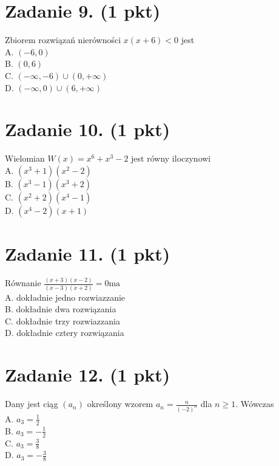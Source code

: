 \documentclass[10pt]{article}
\begin{document}
\section*{Zadanie 9. (1 pkt)}
Zbiorem rozwiązań nierówności \(x(x+6)<0\) jest\\
A. \((-6,0)\)\\
B. \((0,6)\)\\
C. \((-\infty,-6) \cup(0,+\infty)\)\\
D. \((-\infty, 0) \cup(6,+\infty)\)

\section*{Zadanie 10. (1 pkt)}
Wielomian \(W(x)=x^{6}+x^{3}-2\) jest równy iloczynowi\\
A. \(\left(x^{3}+1\right)\left(x^{2}-2\right)\)\\
B. \(\left(x^{3}-1\right)\left(x^{3}+2\right)\)\\
C. \(\left(x^{2}+2\right)\left(x^{4}-1\right)\)\\
D. \(\left(x^{4}-2\right)(x+1)\)

\section*{Zadanie 11. (1 pkt)}
Równanie \(\frac{(x+3)(x-2)}{(x-3)(x+2)}=0 \mathrm{ma}\)\\
A. dokładnie jedno rozwiazzanie\\
B. dokładnie dwa rozwiązania\\
C. dokładnie trzy rozwiazzania\\
D. dokładnie cztery rozwiązania

\section*{Zadanie 12. (1 pkt)}
Dany jest ciąg \(\left(a_{n}\right)\) określony wzorem \(a_{n}=\frac{n}{(-2)^{n}}\) dla \(n \geq 1\). Wówczas\\
A. \(a_{3}=\frac{1}{2}\)\\
B. \(a_{3}=-\frac{1}{2}\)\\
C. \(a_{3}=\frac{3}{8}\)\\
D. \(a_{3}=-\frac{3}{8}\)
\end{document}
